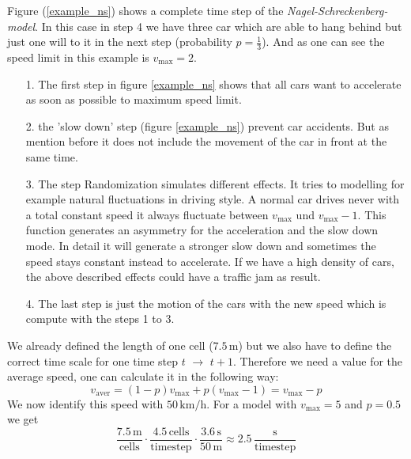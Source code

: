 \documentclass[11pt]{article}
\begin{document}
Figure (\ref{example_ns}) shows a complete time step of the \textit{Nagel-Schreckenberg-model}. In this case in step 4 we have three car which are able to hang behind but just one will to it in the next step (probability $p=\frac{1}{3}$). And as one can see the speed limit in this example is $v_\mathrm{max}=2$.
\begin{itemize}
\item[1.] The first step in figure \ref{example_ns} shows that all cars want to accelerate as soon as possible to maximum speed limit.
\item[2.] the 'slow down' step (figure \ref{example_ns}) prevent car accidents. But as mention before it does not include the movement of the car in front at the same time.
\item[3.] The step Randomization simulates different effects. It tries to modelling for example natural fluctuations in driving style. A normal car drives never with a total constant speed it always fluctuate between $v_\mathrm{max}$ und $v_\mathrm{max}-1$. This function generates an asymmetry for the acceleration and the slow down mode. In detail it will generate a stronger slow down and sometimes the speed stays constant instead to accelerate. If we have a high density of cars, the above described effects could have a traffic jam as result.
\item[4.] The last step is just the motion of the cars with the new speed which is compute with the steps 1 to 3.

\end{itemize}
We already defined the length of one cell ($7.5\,\mathrm{m}$) but we also have to define the correct time scale for one time step $t$ $\rightarrow$ $t+1$. Therefore we need a value for the average speed, one can calculate it in the following way:\\

\begin{equation}
v_\mathrm{aver}=(1-p)v_\mathrm{max} + p(v_\mathrm{max}-1)=v_\mathrm{max}-p
\label{average_speed}
\end{equation}
We now identify this speed with $50\,\mathrm{km/h}$. For a model with $v_\mathrm{max}=5$ and $p=0.5$ we get\\
\begin{equation}
\frac{7.5\,\mathrm{m}}{\mathrm{cells}}\cdot\frac{4.5\,\mathrm{cells}}{\mathrm{timestep}} \cdot \frac{3.6\,\mathrm{s}}{50\,\mathrm{m}}\approx 2.5\,\frac{\mathrm{s}}{\mathrm{timestep}}
\label{time}
\end{equation}
\end{document}
